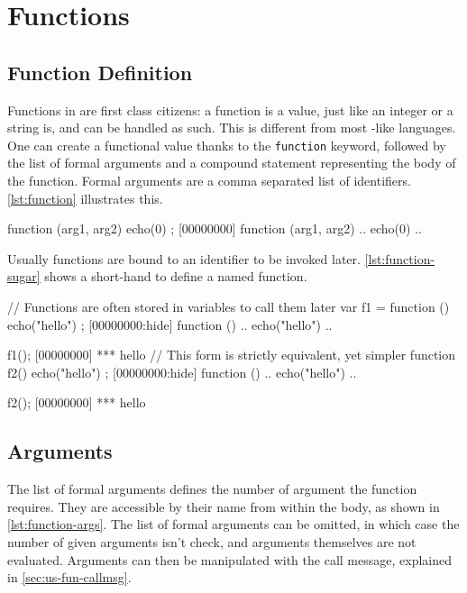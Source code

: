 \FloatBarrier
\section{Functions}

\subsection{Function Definition}

Functions in \us are first class citizens:  a function is a
value, just like an integer
or a string is, and can be handled as such.
This is different from most \C-like languages.
One can create a functional value thanks to the
\lstinline|function| keyword, followed by the list of formal arguments
and a compound statement representing the body of the function. Formal arguments
are a comma separated list of identifiers. \autoref{lst:function} illustrates
this.

\begin{urbiscript}[caption=Functional value,label=lst:function,float=\floatpos]
function (arg1, arg2) { echo(0) };
[00000000] function (arg1, arg2) {
..  echo(0)
..}
\end{urbiscript}

Usually functions are bound to an identifier to be invoked later.
\autoref{lst:function-sugar} shows a short-hand to define a named
function.

\begin{urbiscript}[caption=Storing functions in variables,
  label=lst:function-sugar,float=\floatpos]
// Functions are often stored in variables to call them later
var f1 = function () {
  echo("hello")
};
[00000000:hide] function () {
..  echo("hello")
..}

f1();
[00000000] *** hello
// This form is strictly equivalent, yet simpler
function f2()
{
  echo("hello")
};
[00000000:hide] function () {
..  echo("hello")
..}

f2();
[00000000] *** hello
\end{urbiscript}


\subsection{Arguments}

The list of formal arguments defines the number of argument the
function requires. They are accessible by their name from within the
body, as shown in \autoref{lst:function-args}. The list of formal arguments
can be omitted, in which case the number of given arguments isn't
check, and arguments themselves are not evaluated. Arguments can then
be manipulated with the call message, explained in
\autoref{sec:us-fun-callmsg}.

